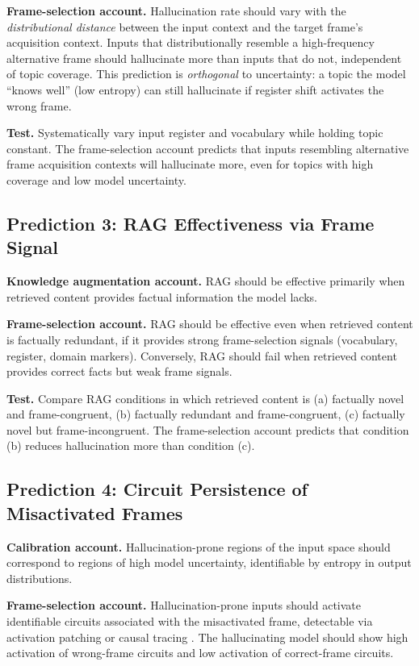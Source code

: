 \documentclass[12pt]{article}
\begin{document}
\textbf{Frame-selection account.} Hallucination rate should vary
with the \emph{distributional distance} between the input context
and the target frame's acquisition context. Inputs that
distributionally resemble a high-frequency alternative frame
should hallucinate more than inputs that do not, independent of
topic coverage. This prediction is \emph{orthogonal} to
uncertainty: a topic the model ``knows well'' (low entropy) can
still hallucinate if register shift activates the wrong frame.

\textbf{Test.} Systematically vary input register and vocabulary
while holding topic constant. The frame-selection account predicts
that inputs resembling alternative frame acquisition contexts
will hallucinate more, even for topics with high coverage and
low model uncertainty.

\subsection{Prediction 3: RAG Effectiveness via Frame Signal}

\textbf{Knowledge augmentation account.} RAG should be effective
primarily when retrieved content provides factual information
the model lacks.

\textbf{Frame-selection account.} RAG should be effective
even when retrieved content is factually redundant, if it
provides strong frame-selection signals (vocabulary, register,
domain markers). Conversely, RAG should fail when retrieved
content provides correct facts but weak frame signals.

\textbf{Test.} Compare RAG conditions in which retrieved content
is (a) factually novel and frame-congruent, (b) factually
redundant and frame-congruent, (c) factually novel but
frame-incongruent. The frame-selection account predicts that
condition (b) reduces hallucination more than condition (c).

\subsection{Prediction 4: Circuit Persistence of Misactivated Frames}

\textbf{Calibration account.} Hallucination-prone regions of
the input space should correspond to regions of high model
uncertainty, identifiable by entropy in output distributions.

\textbf{Frame-selection account.} Hallucination-prone inputs
should activate identifiable circuits associated with the
misactivated frame, detectable via activation patching or
causal tracing \cite{elhage2021mathematical, conmy2023towards}.
The hallucinating model should show high activation of
wrong-frame circuits and low activation of correct-frame
circuits.
\end{document}
